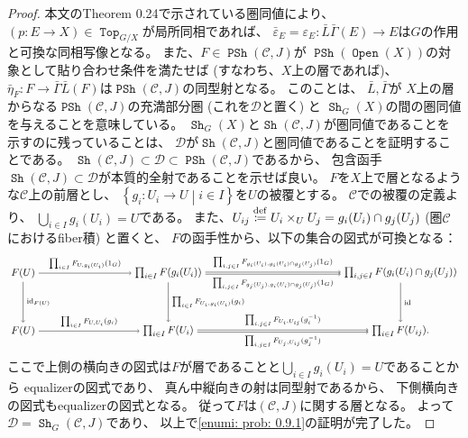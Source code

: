 \documentclass[uplatex]{jsarticle}
\theoremstyle{definition}
\def\ep{\varepsilon}
\def\id{\mathrm{id}}
\def\mcC{\mathcal{C}}
\def\mcD{\mathcal{D}}
\newcommand{\dfn}{\overset{\mathrm{\tiny def}}{\coloneqq}}
\DeclareMathOperator{\sfTop}{\mathtt{Top}}
\DeclareMathOperator{\Sh}{\mathtt{Sh}}
\DeclareMathOperator{\PSh}{\mathtt{PSh}}
\DeclareMathOperator{\Open}{\mathtt{Open}}
\begin{document}
\begin{proof}
  本文のTheorem 0.24で示されている圏同値により、
  \((p:E\to X)\in \sfTop_{G/X}\)が局所同相であれば、
  \(\bar{\ep}_E = \ep_E : \bar{L}\bar{\Gamma}(E) \to E\)は\(G\)の作用と可換な同相写像となる。
  また、\(F\in \PSh(\mcC,J)\)が
  \(\PSh(\Open(X))\)の対象として貼り合わせ条件を満たせば (すなわち、\(X\)上の層であれば)、
  \(\bar{\eta}_F:F\to \bar{\Gamma}\bar{L}(F)\)は\(\PSh(\mcC,J)\)の同型射となる。
  このことは、
  \(\bar{L},\bar{\Gamma}\)が
  \(X\)上の層からなる\(\PSh(\mcC,J)\)の充満部分圏 (これを\(\mcD\)と置く) と
  \(\Sh_G(X)\)の間の圏同値を与えることを意味している。
  \(\Sh_G(X)\)と\(\Sh(\mcC,J)\)が圏同値であることを示すのに残っていることは、
  \(\mcD\)が\(\Sh(\mcC,J)\)と圏同値であることを証明することである。
  \(\Sh(\mcC,J)\subset \mcD\subset \PSh(\mcC,J)\)であるから、
  包含函手\(\Sh(\mcC,J)\subset \mcD\)が本質的全射であることを示せば良い。
  \(F\)を\(X\)上で層となるような\(\mcC\)上の前層とし、
  \(\left\{ g_i:U_i\to U\middle| i\in I\right\}\)を\(U\)の被覆とする。
  \(\mcC\)での被覆の定義より、
  \(\bigcup_{i\in I}g_i(U_i) = U\)である。
  また、\(U_{ij} \dfn U_i\times_U U_j = g_i(U_i)\cap g_j(U_j)\) (圏\(\mcC\)におけるfiber積) と置くと、
  \(F\)の函手性から、以下の集合の図式が可換となる：
  \[
  \begin{tikzpicture}[auto]
    \node (A) at (0,2) {\(F(U)\)};
    \node (B) at (5,2) {\(\prod_{i\in I}F(g_i(U_i))\)};
    \node (C) at (13,2) {\(\prod_{i,j\in I}F(g_i(U_i)\cap g_j(U_j))\)};
    \node (A') at (0,0) {\(F(U)\)};
    \node (B') at (5,0) {\(\prod_{i\in I}F(U_i)\)};
    \node (C') at (13,0) {\(\prod_{i\in I}F(U_{ij}).\)};
    \draw[->] (A) to node {\(\scriptstyle \prod_{i\in I}F_{U,g_i(U_i)}(1_G)\)} (B);
    \draw[->,transform canvas={yshift=1pt}] (B) to node
    {\(\scriptstyle \prod_{i,j\in I}F_{g_i(U_i),g_i(U_i)\cap g_j(U_j)}(1_G)\)} (C);
    \draw[->,transform canvas={yshift=-1pt}] (B) to node[swap]
    {\(\scriptstyle \prod_{i,j\in I}F_{g_j(U_j),g_i(U_i)\cap g_j(U_j)}(1_G)\)} (C);
    \draw[->] (A') to node {\(\scriptstyle \prod_{i\in I}F_{U,U_i}(g_i)\)} (B');
    \draw[->,transform canvas={yshift=1pt}] (B') to node
    {\(\scriptstyle \prod_{i,j\in I}F_{U_i,U_{ij}}(g_i^{-1})\)} (C');
    \draw[->,transform canvas={yshift=-1pt}] (B') to node[swap]
    {\(\scriptstyle \prod_{i,j\in I}F_{U_j,U_{ij}}(g_j^{-1})\)} (C');
    \draw[->] (A) to node {\(\scriptstyle \id_{F(U)}\)} (A');
    \draw[->] (B) to node {\(\scriptstyle \prod_{i\in I}F_{U_i,g_i(U_i)}(g_i)\)} (B');
    \draw[->] (C) to node {\(\scriptstyle \id \)} (C');
  \end{tikzpicture}
  \]
  ここで上側の横向きの図式は\(F\)が層であることと\(\bigcup_{i\in I}g_i(U_i) = U\)であることから
  equalizerの図式であり、
  真ん中縦向きの射は同型射であるから、
  下側横向きの図式もequalizerの図式となる。
  従って\(F\)は\((\mcC,J)\)に関する層となる。
  よって\(\mcD = \Sh_G(\mcC,J)\)であり、
  以上で\ref{enumi: prob: 0.9.1}の証明が完了した。


\end{proof}
\end{document}
